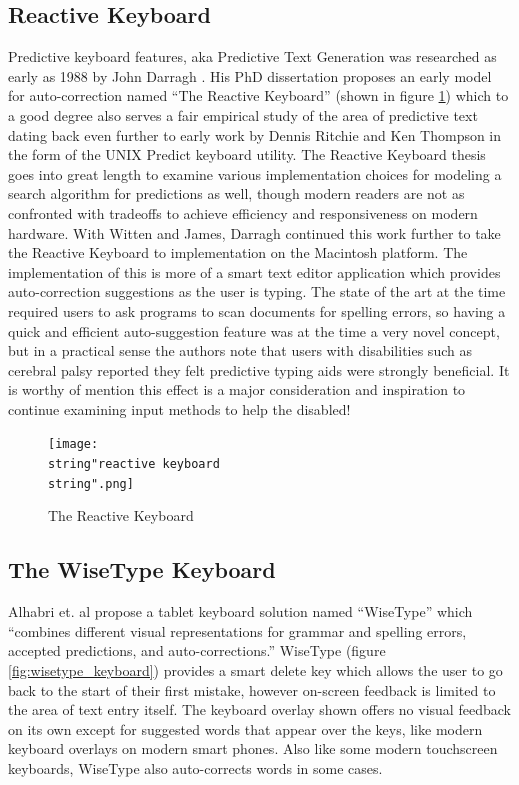 \documentclass[english]{vgtc}
\begin{document}
\subsection{Reactive Keyboard}
Predictive keyboard features, aka Predictive Text Generation was researched
as early as 1988 by John Darragh \cite{darragh88}. His PhD dissertation
proposes an early model for auto-correction named \textquotedblleft The
Reactive Keyboard\textquotedblright{} (shown in figure \ref{fig:reactive_keyboard}) which to
a good degree also serves a fair empirical study of the area of predictive
text dating back even further to early work by Dennis Ritchie and
Ken Thompson in the form of the UNIX Predict keyboard utility. The
Reactive Keyboard thesis goes into great length to examine various
implementation choices for modeling a search algorithm for predictions
as well, though modern readers are not as confronted with tradeoffs
to achieve efficiency and responsiveness on modern hardware. With
Witten and James, Darragh continued this work further \cite{darragh90}
to take the Reactive Keyboard to implementation on the Macintosh platform.
The implementation of this is more of a smart text editor application
which provides auto-correction suggestions as the user is typing.
The state of the art at the time required users to ask programs to
scan documents for spelling errors, so having a quick and efficient
auto-suggestion feature was at the time a very novel concept, but
in a practical sense the authors note that users with disabilities
such as cerebral palsy reported they felt predictive typing aids were
strongly beneficial. It is worthy of mention this effect is a major
consideration and inspiration to continue examining input methods
to help the disabled! 

\begin{figure}
  \centering
  \texttt{[image: \\string"reactive keyboard\\string".png]}
  \caption{The Reactive Keyboard \cite{darragh90}}
  \label{fig:reactive_keyboard}
\end{figure}

\subsection{The WiseType Keyboard}
Alhabri et. al propose a tablet keyboard solution named \textquotedblleft WiseType\textquotedblright{}
\cite{alhabri19} which \textquotedblleft combines different visual
representations for grammar and spelling errors, accepted predictions,
and auto-corrections.\textquotedblright{} WiseType (figure \ref{fig:wisetype_keyboard}) provides
a smart delete key which allows the user to go back to the start of
their first mistake, however on-screen feedback is limited to the
area of text entry itself. The keyboard overlay shown offers no visual
feedback on its own except for suggested words that appear over the
keys, like modern keyboard overlays on modern smart phones. Also like
some modern touchscreen keyboards, WiseType also auto-corrects words
in some cases.
\end{document}
